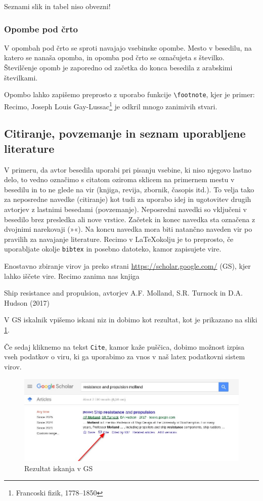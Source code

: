 \documentclass[12pt]{article}
\theoremstyle{definition}
\begin{document}
Seznami slik in tabel niso obvezni!


\subsubsection{Opombe pod črto}

V opombah pod črto se sproti navajajo vsebinske opombe. Mesto v besedilu, na katero se nanaša opomba, in opomba pod črto se označujeta s številko. Številčenje opomb je zaporedno od začetka do konca besedila z arabskimi številkami.

Opombo lahko zapišemo preprosto z uporabo funkcije \texttt{\textbackslash footnote}, kjer je primer: Recimo, Joseph Louis Gay-Lussac\footnote{Francoski fizik, 1778–1850} je odkril mnogo zanimivih stvari.


\subsection{Citiranje, povzemanje in seznam uporabljene literature}

V primeru, da avtor besedila uporabi pri pisanju vsebine, ki niso njegovo lastno delo, to vedno označimo s citatom oziroma sklicem na primernem mestu v besedilu in to ne glede na vir (knjiga, revija, zbornik, časopis itd.). To velja tako za neposredne navedke (citiranje) kot tudi za uporabo idej in ugotovitev drugih avtorjev z lastnimi besedami (povzemanje). 
Neposredni navedki so vključeni v besedilo brez presledka ali nove vrstice. Začetek in konec navedka sta označena z dvojnimi narekovaji (»«). Na koncu navedka mora biti natančno naveden vir po pravilih za navajanje literature. Recimo v \LaTeX okolju je to preprosto, če uporabljate okolje \texttt{bibtex} in posebno datoteko, kamor zapisujete vire.

Enostavno zbiranje virov ja preko strani \url{https://scholar.google.com/} (GS), kjer lahko iščete vire. Recimo zanima nas knjiga

Ship resistance and propulsion, avtorjev A.F. Molland, S.R. Turnock in D.A. Hudson (2017)

V GS iskalnik vpišemo iskani niz in dobimo kot rezultat, kot je prikazano na sliki \ref{fig:gs_cite_01}.

Če sedaj kliknemo na tekst \texttt{Cite}, kamor kaže puščica, dobimo možnost izpisa vseh podatkov o viru, ki ga uporabimo za vnos v naš latex podatkovni sistem virov.

\begin{figure}[h]
	\begin{center}
		\includegraphics[width=0.8\linewidth]{figs/gs_reference_01.jpg}
	\end{center}
	\caption{Rezultat iskanja v GS}
	\label{fig:gs_cite_01}
\end{figure}
\end{document}
